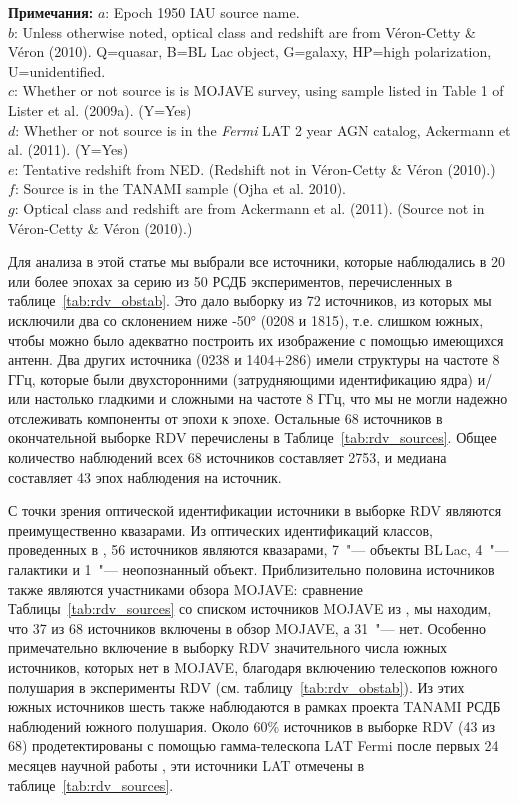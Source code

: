 \begin{table}
\textbf{Примечания:}
$a$: Epoch 1950 IAU source name.\\
$b$: Unless otherwise noted, optical class and redshift are from V\'{e}ron-Cetty \& V\'{e}ron
(2010).
Q=quasar, B=BL Lac object, G=galaxy, HP=high polarization, U=unidentified.\\
$c$: Whether or not source is is MOJAVE survey, using sample
listed in Table 1 of Lister et al. (2009a). (Y=Yes)\\
$d$: Whether or not source is in the {\em Fermi} LAT 2 year AGN catalog, Ackermann et al. (2011).
(Y=Yes)\\
$e$: Tentative redshift from NED. (Redshift not in V\'{e}ron-Cetty \& V\'{e}ron (2010).)\\
$f$: Source is in the TANAMI sample (Ojha et al. 2010).\\
$g$: Optical class and redshift are from Ackermann et al. (2011). (Source not in V\'{e}ron-Cetty \&
V\'{e}ron (2010).)\\
\end{table}

Для анализа в этой статье мы выбрали все источники, которые наблюдались в 20 или более эпохах за
серию из 50 РСДБ экспериментов, перечисленных в таблице~\ref{tab:rdv_obstab}. Это дало выборку из 72
источников, из которых мы исключили два со склонением ниже \ang{-50} (0208 и
1815), т.\:е. слишком южных, чтобы можно было адекватно построить их изображение с
помощью имеющихся антенн. Два других источника (0238 и 1404+286) имели структуры на
частоте 8 ГГц, которые были двухсторонними (затрудняющими идентификацию ядра) и/или настолько
гладкими и сложными на частоте 8 ГГц, что мы не могли надежно отслеживать компоненты от эпохи к
эпохе. Остальные 68 источников в окончательной выборке RDV перечислены в
Таблице~\ref{tab:rdv_sources}. Общее количество наблюдений всех 68 источников составляет 2753, и
медиана составляет 43 эпох наблюдения на источник.

С точки зрения оптической идентификации источники в выборке RDV являются преимущественно квазарами.
Из оптических идентификаций классов, проведенных в \cite{Veron_2010}, 56 источников являются
квазарами, 7~"--- объекты BL\,Lac, 4~"--- галактики и 1~"--- неопознанный объект. Приблизительно
половина источников также являются участниками обзора MOJAVE: сравнение
Таблицы~\ref{tab:rdv_sources} со списком источников MOJAVE из \cite{Lister_2009a}, мы находим, что
37 из 68 источников включены в обзор MOJAVE, а 31~"--- нет. Особенно примечательно включение в
выборку RDV значительного числа южных источников, которых нет в MOJAVE, благодаря включению
телескопов южного полушария в эксперименты RDV (см. таблицу~\ref{tab:rdv_obstab}). Из этих южных
источников шесть также наблюдаются в рамках проекта TANAMI \cite{Ojha_2010} РСДБ наблюдений южного
полушария. Около 60\% источников в выборке RDV (43 из 68) продетектированы с помощью гамма-телескопа
LAT Fermi после первых 24 месяцев научной работы \cite{Ackermann_2011}, эти источники LAT отмечены в
таблице~\ref{tab:rdv_sources}.

